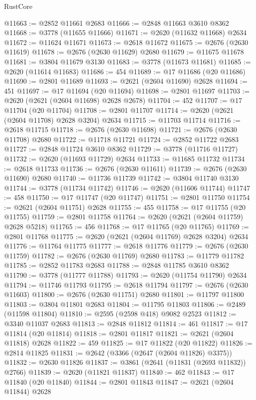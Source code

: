 \begin{lexlean}{RustCore}
\begin{coremodule}
@11663 := @2852 @11661 @2683
@11666 := @2848 @11663 @3610 @8362
@11668 := @3778 (@11655 @11666)
@11671 := @2620 (@11632 @11668) @2634
@11672 := @11624 @11671
@11673 := @2618 @11672
@11675 := @2676 (@2630 @11619)
@11678 := @2676 (@2630 @11629) @2680
@11679 := @11675 @11678
@11681 := @3804 @11679 @3130
@11683 := @3778 (@11673 @11681)
@11685 := @2620 (@11614 @11683)
@11686 := 454
@11689 := @17 @11686 (@20 @11686)
@11690 := @2801 @11689
@11693 := @2621 (@2604 @11690) @2628
@11694 := 451
@11697 := @17 @11694 (@20 @11694)
@11698 := @2801 @11697
@11703 := @2620 (@2621 (@2604 @11698) @2628 @2678)
@11704 := 452
@11707 := @17 @11704 (@20 @11704)
@11708 := @2801 @11707
@11714 := @2620 (@2621 (@2604 @11708) @2628 @3204) @2634
@11715 := @11703 @11714
@11716 := @2618 @11715
@11718 := @2676 (@2630 @11698)
@11721 := @2676 (@2630 @11708) @2680
@11722 := @11718 @11721
@11724 := @2852 @11722 @2683
@11727 := @2848 @11724 @3610 @8362
@11729 := @3778 (@11716 @11727)
@11732 := @2620 (@11693 @11729) @2634
@11733 := @11685 @11732
@11734 := @2618 @11733
@11736 := @2676 (@2630 @11611)
@11739 := @2676 (@2630 @11690) @2680
@11740 := @11736 @11739
@11742 := @3804 @11740 @3130
@11744 := @3778 (@11734 @11742)
@11746 := @2620 (@11606 @11744)
@11747 := 458
@11750 := @17 @11747 (@20 @11747)
@11751 := @2801 @11750
@11754 := @2621 (@2604 @11751) @2628
@11755 := 455
@11758 := @17 @11755 (@20 @11755)
@11759 := @2801 @11758
@11764 := @2620 (@2621 (@2604 @11759) @2628 @5218)
@11765 := 456
@11768 := @17 @11765 (@20 @11765)
@11769 := @2801 @11768
@11775 := @2620 (@2621 (@2604 @11769) @2628 @3204) @2634
@11776 := @11764 @11775
@11777 := @2618 @11776
@11779 := @2676 (@2630 @11759)
@11782 := @2676 (@2630 @11769) @2680
@11783 := @11779 @11782
@11785 := @2852 @11783 @2683
@11788 := @2848 @11785 @3610 @8362
@11790 := @3778 (@11777 @11788)
@11793 := @2620 (@11754 @11790) @2634
@11794 := @11746 @11793
@11795 := @2618 @11794
@11797 := @2676 (@2630 @11603)
@11800 := @2676 (@2630 @11751) @2680
@11801 := @11797 @11800
@11803 := @3804 @11801 @2683
@11804 := @11795 @11803
@11806 := @2489 (@11598 @11804)
@11810 := @2595 (@2598 @418) @9082 @2523
@11812 := @3340 @11037 @2683
@11813 := @2848 @11812
@11814 := 461
@11817 := @17 @11814 (@20 @11814)
@11818 := @2801 @11817
@11821 := @2621 (@2604 @11818) @2628
@11822 := 459
@11825 := @17 @11822 (@20 @11822)
@11826 := @2814 @11825
@11831 := @2642 (@3366 (@2647 (@2604 @11826) @3375))
@11832 := @2630 @11826
@11837 := @3861 (@2641 (@11831 (@2693 @11832)) @2766)
@11839 := @2620 (@11821 @11837)
@11840 := 462
@11843 := @17 @11840 (@20 @11840)
@11844 := @2801 @11843
@11847 := @2621 (@2604 @11844) @2628

\end{coremodule}
\end{lexlean}
